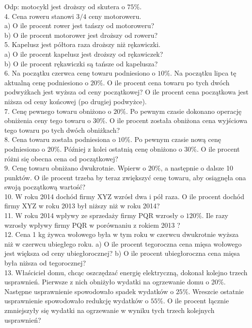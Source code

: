 \documentclass[10pt]{article}
\begin{document}
Odp: motocykl jest droższy od skutera o \(75 \%\).\\
4. Cena roweru stanowi \(3 / 4\) ceny motoroweru.\\
a) O ile procent rower jest tańszy od motoroweru?\\
b) O ile procent motorower jest droższy od roweru?\\
5. Kapelusz jest półtora raza droższy niż rękawiczki.\\
a) O ile procent kapelusz jest droższy od rękawiczek?\\
b) O ile procent rękawiczki są tańsze od kapelusza?\\
6. Na początku czerwca cenę towaru podniesiono o \(10 \%\). Na początku lipca tę aktualną cenę podniesiono o \(20 \%\). O ile procent cena towaru po tych dwóch podwyżkach jest wyższa od ceny początkowej? O ile procent cena początkowa jest niższa od ceny końcowej (po drugiej podwyżce).\\
7. Cenę pewnego towaru obniżono o \(20 \%\). Po pewnym czasie dokonano operację obniżenia ceny tego towaru o \(30 \%\). O ile procent została obniżona cena wyjściowa tego towaru po tych dwóch obniżkach?\\
8. Cena towaru została podniesiona o \(10 \%\). Po pewnym czasie nową cenę podniesiono o \(20 \%\). Później z kolei ostatnią cenę obniżono o \(30 \%\). O ile procent różni się obecna cena od początkowej?\\
9. Cenę towaru obniżano dwukrotnie. Wpierw o \(20 \%\), a następnie o dalsze 10 punktów. O ile procent trzeba by teraz zwiększyć cenę towaru, aby osiągnęła ona swoją początkową wartość?\\
10. W roku 2014 dochód firmy XYZ wzrósł dwa i pół raza. O ile procent dochód firmy XYZ w roku 2013 był niższy niż w roku 2014?\\
11. W roku 2014 wpływy ze sprzedaży firmy PQR wzrosły o \(120 \%\). Ile razy wzrosły wpływy firmy PQR w porównaniu z rokiem 2013 ?\\
12. Cena 1 kg żywca wołowego była w tym roku w czerwcu dwukrotnie wyższa niż w czerwcu ubiegłego roku. a) O ile procent tegoroczna cena mięsa wołowego jest większa od ceny ubiegłorocznej? b) O ile procent ubiegłoroczna cena mięsa była niższa od tegorocznej?\\
13. Właściciel domu, chcąc oszczędzać energię elektryczną, dokonał kolejno trzech usprawnień. Pierwsze z nich obniżyło wydatki na ogrzewanie domu o 20\%. Następne usprawnienie spowodowało spadek wydatków o \(25 \%\). Wreszcie ostatnie usprawnienie spowodowało redukcję wydatków o \(55 \%\). O ile procent łącznie zmniejszyły się wydatki na ogrzewanie w wyniku tych trzech kolejnych usprawnień?\\
\end{document}
